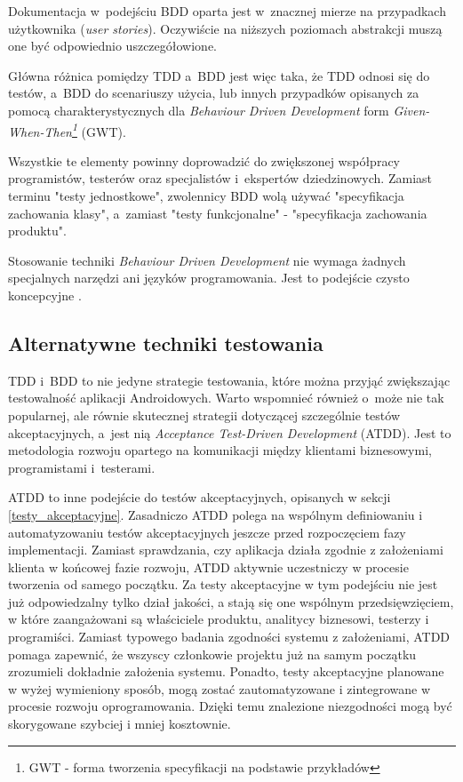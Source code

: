Dokumentacja w~podejściu BDD oparta jest w~znacznej mierze na przypadkach użytkownika (\textit{user stories}). Oczywiście na niższych poziomach abstrakcji muszą one być odpowiednio uszczegółowione.

Główna różnica pomiędzy TDD a~BDD jest więc taka, że TDD odnosi się do testów, a~BDD do scenariuszy użycia, lub innych przypadków opisanych za pomocą charakterystycznych dla \textit{Behaviour Driven Development} form \textit{Given-When-Then\footnote{GWT - forma tworzenia specyfikacji na podstawie przykładów}} (GWT).

Wszystkie te elementy powinny doprowadzić do zwiększonej współpracy programistów, testerów oraz specjalistów i~ekspertów dziedzinowych. Zamiast terminu "testy jednostkowe", zwolennicy BDD wolą używać "specyfikacja zachowania klasy", a~zamiast "testy funkcjonalne" - "specyfikacja zachowania produktu".

Stosowanie techniki \textit{Behaviour Driven Development} nie wymaga żadnych specjalnych narzędzi ani języków programowania. Jest to podejście czysto koncepcyjne \cite{website:agile:guide}.

\subsection{Alternatywne techniki testowania}
\label{alternatywne_metody_testowania}
TDD i~BDD to nie jedyne strategie testowania, które można przyjąć zwiększając testowalność aplikacji Androidowych. Warto wspomnieć również o~może nie tak popularnej, ale równie skutecznej strategii dotyczącej szczególnie testów akceptacyjnych, a~jest nią \textit{Acceptance Test-Driven Development} (ATDD). Jest to metodologia rozwoju opartego na komunikacji między klientami biznesowymi, programistami i~testerami. 

ATDD to inne podejście do testów akceptacyjnych, opisanych w sekcji \ref{testy_akceptacyjne}. Zasadniczo ATDD polega na wspólnym definiowaniu i automatyzowaniu testów akceptacyjnych jeszcze przed rozpoczęciem fazy implementacji. Zamiast sprawdzania, czy aplikacja działa zgodnie z założeniami klienta w końcowej fazie rozwoju, ATDD aktywnie uczestniczy w procesie tworzenia od samego początku. Za testy akceptacyjne w tym podejściu nie jest już odpowiedzalny tylko dział jakości, a stają się one wspólnym przedsięwzięciem, w które zaangażowani są właściciele produktu, analitycy biznesowi, testerzy i programiści. Zamiast typowego badania zgodności systemu z założeniami, ATDD pomaga zapewnić, że wszyscy członkowie projektu już na samym początku zrozumieli dokładnie założenia systemu. Ponadto, testy akceptacyjne planowane w wyżej wymieniony sposób, mogą zostać zautomatyzowane i zintegrowane w procesie rozwoju oprogramowania. Dzięki temu znalezione niezgodności mogą być skorygowane szybciej i mniej kosztownie.

